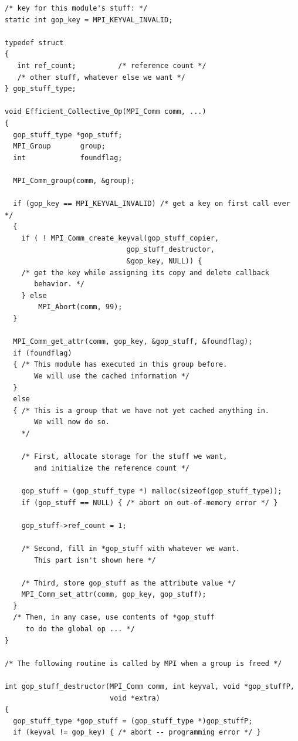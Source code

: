 %
\begin{lstlisting}[language={[MPI]C}]
/* key for this module's stuff: */
static int gop_key = MPI_KEYVAL_INVALID;

typedef struct
{
   int ref_count;          /* reference count */
   /* other stuff, whatever else we want */
} gop_stuff_type;

void Efficient_Collective_Op(MPI_Comm comm, ...)
{
  gop_stuff_type *gop_stuff;
  MPI_Group       group;
  int             foundflag;

  MPI_Comm_group(comm, &group);

  if (gop_key == MPI_KEYVAL_INVALID) /* get a key on first call ever */
  {
    if ( ! MPI_Comm_create_keyval(gop_stuff_copier,
                             gop_stuff_destructor,
                             &gop_key, NULL)) {
    /* get the key while assigning its copy and delete callback
       behavior. */
    } else
        MPI_Abort(comm, 99);
  }

  MPI_Comm_get_attr(comm, gop_key, &gop_stuff, &foundflag);
  if (foundflag)
  { /* This module has executed in this group before.
       We will use the cached information */
  }
  else
  { /* This is a group that we have not yet cached anything in.
       We will now do so.
    */

    /* First, allocate storage for the stuff we want,
       and initialize the reference count */

    gop_stuff = (gop_stuff_type *) malloc(sizeof(gop_stuff_type));
    if (gop_stuff == NULL) { /* abort on out-of-memory error */ }

    gop_stuff->ref_count = 1;

    /* Second, fill in *gop_stuff with whatever we want.
       This part isn't shown here */

    /* Third, store gop_stuff as the attribute value */
    MPI_Comm_set_attr(comm, gop_key, gop_stuff);
  }
  /* Then, in any case, use contents of *gop_stuff
     to do the global op ... */
}

/* The following routine is called by MPI when a group is freed */

int gop_stuff_destructor(MPI_Comm comm, int keyval, void *gop_stuffP, 
                         void *extra)
{
  gop_stuff_type *gop_stuff = (gop_stuff_type *)gop_stuffP;
  if (keyval != gop_key) { /* abort -- programming error */ }


\end{lstlisting}
